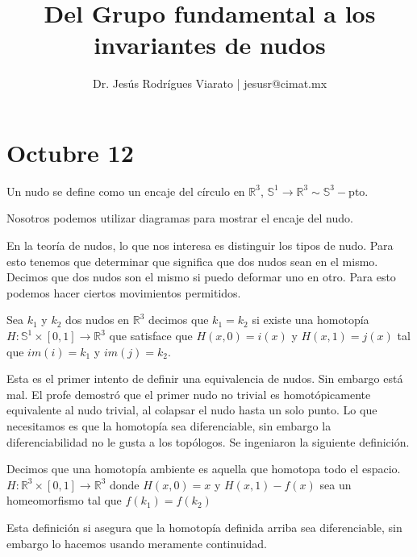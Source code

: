 \documentclass{article}
\title{Del Grupo fundamental a los invariantes de nudos}
\author{Dr. Jesús Rodrígues Viarato | jesusr@cimat.mx}
\theoremstyle{mytheoremstyle}
\theoremstyle{mytheoremstyle}
\theoremstyle{myproblemstyle}
\begin{document}
    \maketitle
    \section{Octubre 12}
    \begin{definition}[Nudos]
      Un nudo se define como un encaje del círculo en $\mathbb{R}^3$, $\mathbb{S}^1 \to \mathbb{R}^3 \sim \mathbb{S}^3 - \text{pto}$. 
    \end{definition}
    Nosotros podemos utilizar diagramas para mostrar el encaje del nudo. 

    En la teoría de nudos, lo que nos interesa es distinguir los tipos de nudo. Para esto tenemos que determinar que significa que dos nudos sean en el mismo. Decimos que dos nudos son el mismo si puedo deformar uno en otro. Para esto podemos hacer ciertos movimientos permitidos. 
    \begin{definition}
      Sea $k_1$ y $k_2$ dos nudos en $\mathbb{R}^3$ decimos que $k_1 = k_2 $ si existe una homotopía $H: \mathbb{S}^1 \times [0,1] \to \mathbb{R}^3$ que satisface que $H(x,0)=i(x)$ y $H(x,1)=j(x)$ tal que $im(i)=k_1$ y $im(j)=k_2$.
    \end{definition}

    Esta es el primer intento de definir una equivalencia de nudos. Sin embargo está mal. El profe demostró que el primer nudo no trivial es homotópicamente equivalente al nudo trivial, al colapsar el nudo hasta un solo punto. Lo que necesitamos es que la homotopía sea diferenciable, sin embargo la diferenciabilidad no le gusta a los topólogos. Se ingeniaron la siguiente definición.
    \begin{definition}
      Decimos que una homotopía ambiente es aquella que homotopa todo el espacio. $H: \mathbb{R}^3\times [0,1] \to \mathbb{R}^3$ donde $H(x,0)=x$ y $H(x,1)-f(x)$ sea un homeomorfismo tal que $f(k_1)=f(k_2)$
    \end{definition}
    Esta definición si asegura que la homotopía definida arriba sea diferenciable, sin embargo lo hacemos usando meramente continuidad. 
\end{document}

